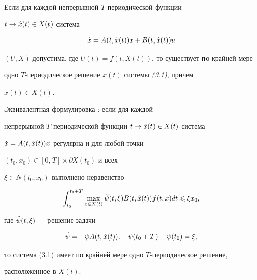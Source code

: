 \begin{thm} Если для каждой непрерывной $T$-периодической функции


$t \to \Hat x(t) \in X(t)$ система


%


\begin{equation}


\Dot x = A(t,\Hat x(t))x + B(t,\Hat x(t))u


\end{equation}


%


$(U,X)$-допустима, где $U(t)=f(t,X(t))$, то существует по крайней мере


одно $T$-периодическое решение $x(t)$ системы {\em (3.1)}, причем


$x(t)\in X(t)$.


\end{thm}





\begin{note} Эквивалентная формулировка \cite{Pet2}: если для каждой


непрерывной $T$-перио\-дической функции $t\to \Hat x(t)\in X(t)$ система


$\Dot x = A(t,\Hat x(t))x$ регулярна и для любой точки


$(t_0,x_0) \in [0,T]\times\partial X(t_0)$ и всех


$\xi \in N(t_0,x_0)$ выполнено неравенство


%


\begin{equation}


\int_{t_0}^{t_0+T}\max_{x\in X(t)}\Hat \psi(t,\xi)B(t,\Hat x(t))f(t,x) dt \le


\xi x_0,


\end{equation}


%


где $\Hat\psi(t,\xi)$ --- решение задачи


%


\begin{equation}


\Dot \psi = -\psi A(t,\Hat x(t)), \quad \psi(t_0+T) - \psi(t_0) = \xi,


\end{equation}


%


то система (3.1) имеет по крайней мере одно $T$-периодическое решение,


расположенное в $X(t)$.


\end{note}





